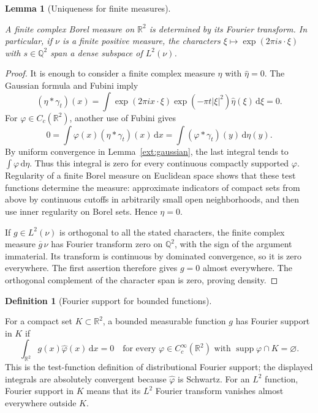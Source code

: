 \documentclass[11pt]{amsart}
\newcommand{\R}{\mathbb R}
\newcommand{\Q}{\mathbb Q}
\newcommand{\dd}{\,\mathrm d}
\DeclareMathOperator{\supp}{supp}
\newtheorem{lemma}[theorem]{Lemma}
\theoremstyle{definition}
\newtheorem{definition}[theorem]{Definition}
\theoremstyle{remark}
\numberwithin{equation}{section}
\providecommand{\lean}[1]{}
\providecommand{\leanok}{}
\begin{document}
\begin{lemma}[Uniqueness for finite measures]\label{ext:fourier-uniqueness}
\lean{Auto.ext_fourier_uniqueness,Auto.ext_fourier_uniqueness_dense}
\leanok
A finite complex Borel measure on $\R^2$ is determined by its
Fourier transform.  In particular, if $\nu$ is a finite positive
measure, the characters
$\xi\mapsto\exp(2\pi i s\cdot\xi)$ with $s\in\Q^2$ span a
dense subspace of $L^2(\nu)$.
\end{lemma}
\begin{proof}
It is enough to consider a finite complex measure $\eta$ with
$\widehat\eta=0$.  The Gaussian formula and Fubini imply
\[
 (\eta*\gamma_t)(x)
 =\int\exp(2\pi i x\cdot\xi)\exp(-\pi t|\xi|^2)
                          \widehat\eta(\xi)\dd\xi=0.
\]
For $\varphi\in C_c(\R^2)$, another use of Fubini gives
\[
 0=\int\varphi(x)(\eta*\gamma_t)(x)\dd x
   =\int(\varphi*\gamma_t)(y)\dd\eta(y).
\]
By uniform convergence in Lemma~\ref{ext:gaussian}, the last
integral tends to $\int\varphi\dd\eta$.  Thus this integral is
zero for every continuous compactly supported $\varphi$.
Regularity of a finite Borel measure on Euclidean space shows
that these test functions determine the measure: approximate
indicators of compact sets from above by continuous cutoffs in
arbitrarily small open neighborhoods, and then use inner
regularity on Borel sets.  Hence $\eta=0$.

If $g\in L^2(\nu)$ is orthogonal to all the stated characters,
the finite complex measure $\overline g\,\nu$ has Fourier
transform zero on $\Q^2$, with the sign of the argument
immaterial.  Its transform is continuous by dominated
convergence, so it is zero everywhere.  The first assertion
therefore gives $g=0$ almost everywhere.  The orthogonal
complement of the character span is zero, proving density.
\end{proof}

\begin{definition}[Fourier support for bounded functions]
\label{ext:bounded-support}
\lean{Auto.HasFourierSupportIn,Auto.HasL2FourierSupportIn}
For a compact set $K\subset\R^2$, a bounded measurable function $g$
has Fourier support in $K$ if
\[
 \int_{\R^2}g(x)\widehat\varphi(x)\dd x=0
 \quad\text{for every }\varphi\in C_c^\infty(\R^2)
 \text{ with }\supp\varphi\cap K=\varnothing.
\]
This is the test-function definition of distributional Fourier support;
the displayed integrals are absolutely convergent because
$\widehat\varphi$ is Schwartz.  For an $L^2$ function, Fourier support
in $K$ means that its $L^2$ Fourier transform vanishes almost everywhere
outside $K$.
\end{definition}
\end{document}
